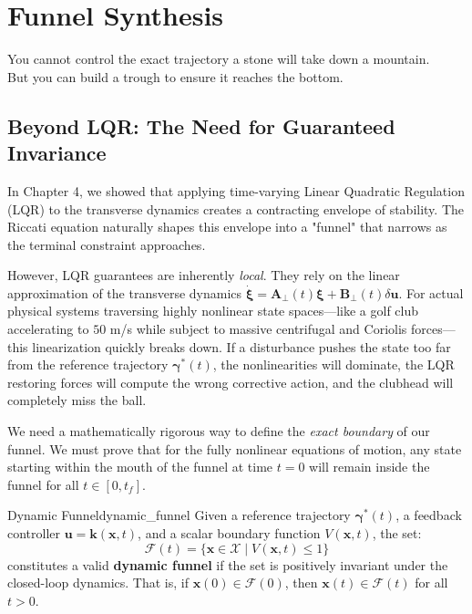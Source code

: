 \documentclass[12pt, openany]{book}
\theoremstyle{plain}
\newcommand{\state}{\bm{x}}
\newcommand{\control}{\bm{u}}
\newcommand{\traj}{\bm{\gamma}}
\newcommand{\statespace}{\mathcal{X}}
\begin{document}
\setcounter{chapter}{6}

\chapter{Funnel Synthesis}

\epigraph{%
  You cannot control the exact trajectory a stone will take down a mountain.\\
  But you can build a trough to ensure it reaches the bottom.
}{}

\vspace{0.5cm}

\section{Beyond LQR: The Need for Guaranteed Invariance}

In Chapter 4, we showed that applying time-varying Linear Quadratic Regulation (LQR) to the transverse dynamics creates a contracting envelope of stability. The Riccati equation naturally shapes this envelope into a "funnel" that narrows as the terminal constraint approaches. 

However, LQR guarantees are inherently \emph{local}. They rely on the linear approximation of the transverse dynamics $\dot{\bm{\xi}} = \bm{A}_\perp(t)\bm{\xi} + \bm{B}_\perp(t)\delta\control$. For actual physical systems traversing highly nonlinear state spaces—like a golf club accelerating to $50$ m/s while subject to massive centrifugal and Coriolis forces—this linearization quickly breaks down. If a disturbance pushes the state too far from the reference trajectory $\traj^*(t)$, the nonlinearities will dominate, the LQR restoring forces will compute the wrong corrective action, and the clubhead will completely miss the ball.

We need a mathematically rigorous way to define the \emph{exact boundary} of our funnel. We must prove that for the fully nonlinear equations of motion, any state starting within the mouth of the funnel at time $t=0$ will remain inside the funnel for all $t \in [0, t_f]$.

\begin{definition}{Dynamic Funnel}{dynamic_funnel}
  Given a reference trajectory $\traj^*(t)$, a feedback controller $\control = \bm{k}(\state, t)$, and a scalar boundary function $V(\state, t)$, the set:
  \begin{equation}
    \mathcal{F}(t) = \{ \state \in \statespace \mid V(\state, t) \leq 1 \}
  \end{equation}
  constitutes a valid \textbf{dynamic funnel} if the set is positively invariant under the closed-loop dynamics. That is, if $\state(0) \in \mathcal{F}(0)$, then $\state(t) \in \mathcal{F}(t)$ for all $t > 0$.
\end{definition}
\end{document}
